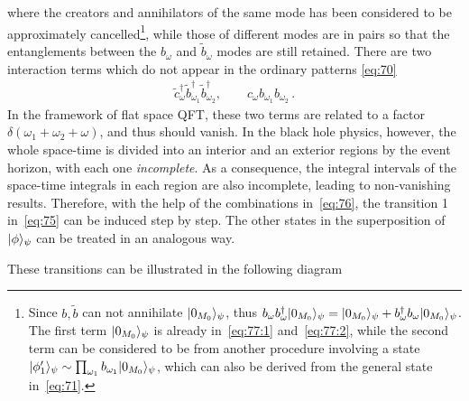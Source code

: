 \documentclass[12pt,a4paper]{article}
\begin{document}
where the creators and annihilators of the same mode has been considered to be approximately cancelled\footnote{Since $b,\tilde{b}$ can not annihilate $\arrowvert0_{M_0}\rangle_{\psi}$, thus $b_{\omega}b_{\omega}^{\dag}\arrowvert0_{M_0}\rangle_{\psi}=\arrowvert0_{M_0}\rangle_{\psi}+b_{\omega}^{\dag}b_{\omega}\arrowvert0_{M_0}\rangle_{\psi}$. The first term $\arrowvert0_{M_0}\rangle_{\psi}$ is already in~\eqref{eq:77:1} and~\eqref{eq:77:2}, while the second term can be considered to be from another procedure involving a state $\arrowvert\phi'_1\rangle_{\psi}\sim\prod_{\omega_1}b_{\omega_1}\arrowvert0_{M_0}\rangle_{\psi}$, which can also be derived from the general state in~\eqref{eq:71}.}, while those of different modes are in pairs so that the entanglements between the $b_{\omega}$ and $\tilde{b}_{\omega}$ modes are still retained. There are two interaction terms which do not appear in the ordinary patterns
\eqref{eq:70}
\begin{equation}
\label{eq:78}
\begin{split}
\tilde{c}_{\omega}^{\dag}\tilde{b}_{\omega_1}^{\dag}\tilde{b}_{\omega_2}^{\dag},\qquad
c_{\omega}b_{\omega_1}b_{\omega_2} \,.
\end{split}
\end{equation}
In the framework of flat space QFT, these two terms are related to a factor $\delta(\omega_1+\omega_2+\omega)$, and thus should vanish. In the black hole physics, however, the whole space-time is divided into an interior and an exterior regions by the event horizon, with each one \emph{incomplete}. As a consequence, the integral intervals of the space-time integrals in each region are also incomplete, leading
to non-vanishing results. Therefore, with the help of the combinations in~\eqref{eq:76}, the transition 1 in~\eqref{eq:75} can be induced step by step.
The other states in the superposition of $\arrowvert\phi\rangle_{\psi}$
can be treated in an analogous way.

These transitions can be illustrated in the following diagram
\end{document}
